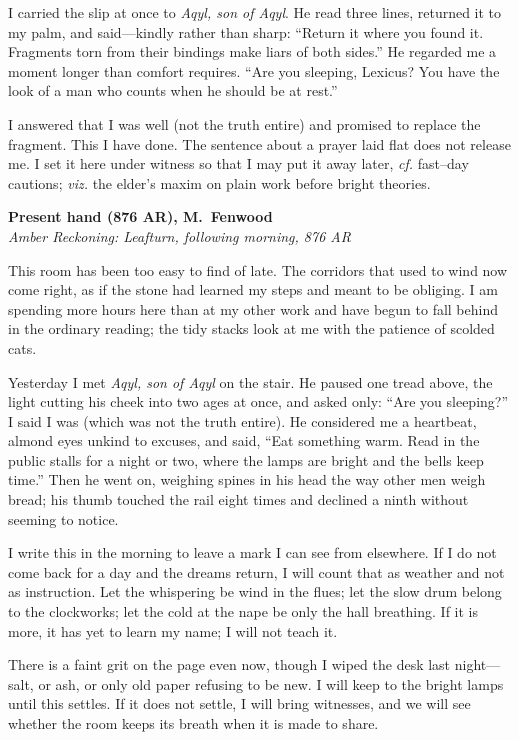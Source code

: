 \documentclass[11pt]{article}
\numberwithin{equation}{section} %
\theoremstyle{plain} %
\theoremstyle{definition} %
\theoremstyle{remark} %
\begin{document}
I carried the slip at once to \textit{Aqyl, son of Aqyl}. He read three lines, returned it to my palm, and said—kindly rather than sharp: “Return it where you found it. Fragments torn from their bindings make liars of both sides.” He regarded me a moment longer than comfort requires. “Are you sleeping, Lexicus? You have the look of a man who counts when he should be at rest.”

I answered that I was well (not the truth entire) and promised to replace the fragment. This I have done. The sentence about a prayer laid flat does not release me. I set it here under witness so that I may put it away later, \emph{cf.} fast–day cautions; \emph{viz.} the elder’s maxim on plain work before bright theories.

\medskip
\noindent\textbf{Present hand (876 AR), M.\ Fenwood}\\
\noindent\textit{Amber Reckoning: Leafturn, following morning, 876 AR}

This room has been too easy to find of late. The corridors that used to wind now come right, as if the stone had learned my steps and meant to be obliging. I am spending more hours here than at my other work and have begun to fall behind in the ordinary reading; the tidy stacks look at me with the patience of scolded cats.

Yesterday I met \textit{Aqyl, son of Aqyl} on the stair. He paused one tread above, the light cutting his cheek into two ages at once, and asked only: “Are you sleeping?” I said I was (which was not the truth entire). He considered me a heartbeat, almond eyes unkind to excuses, and said, “Eat something warm. Read in the public stalls for a night or two, where the lamps are bright and the bells keep time.” Then he went on, weighing spines in his head the way other men weigh bread; his thumb touched the rail eight times and declined a ninth without seeming to notice.

I write this in the morning to leave a mark I can see from elsewhere. If I do not come back for a day and the dreams return, I will count that as weather and not as instruction. Let the whispering be wind in the flues; let the slow drum belong to the clockworks; let the cold at the nape be only the hall breathing. If it is more, it has yet to learn my name; I will not teach it.

There is a faint grit on the page even now, though I wiped the desk last night—salt, or ash, or only old paper refusing to be new. I will keep to the bright lamps until this settles. If it does not settle, I will bring witnesses, and we will see whether the room keeps its breath when it is made to share.
\end{document}
